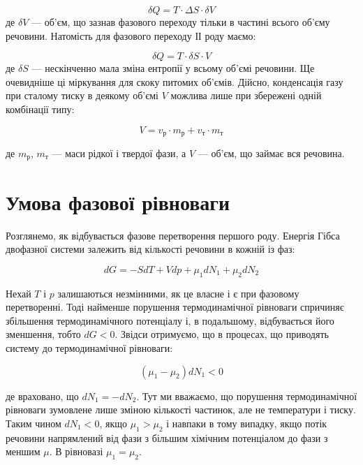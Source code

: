 \begin{equation}
\delta Q = T \cdot \Delta S \cdot \delta V
\end{equation}
%
де $\delta V$ --- об'єм, що зазнав фазового переходу тільки в частині всього об'єму речовини.
Натомість для фазового переходу ІІ роду маємо:

\begin{equation}
\delta Q = T \cdot \delta S \cdot V
\end{equation}
%
де $\delta S$ --- нескінченно мала зміна ентропії у всьому об'ємі речовини. Ще очевидніше ці
міркування для скоку питомих об'ємів. Дійсно, конденсація газу при сталому тиску в деякому об'ємі $V$
можлива лише при збережені одній комбінації типу:

\begin{equation}
V = v_{\text{р}} \cdot m_{\text{р}} + v_{\text{т}} \cdot m_{\text{т}}
\end{equation}

де $m_{\text{р}}$, $m_{\text{т}}$ --- маси рідкої і твердої фази, а $V$ --- об'єм, що займає вся
речовина.


\section{Умова фазової рівноваги}

Розглянемо, як відбувається фазове перетворення першого роду. Енергія Гібса двофазної
системи залежить від кількості речовини в кожній із фаз:

\begin{equation}
dG = -SdT + Vdp + \mu_1 dN_1 + \mu_2 dN_2
\end{equation}

Нехай $T$ і $p$ залишаються незмінними, як це власне і є при фазовому перетворенні. Тоді найменше
порушення термодинамічної рівноваги спричиняє збільшення термодинамічного потенціалу і, в подальшому,
відбувається його зменшення, тобто $dG < 0$. Звідси отримуємо, що в процесах, що приводять систему до
термодинамічної рівноваги:

\begin{equation}
(\mu_1 - \mu_2)dN_1 < 0
\end{equation}

де враховано, що $dN_1 = -dN_2$. Тут ми вважаємо, що порушення термодинамічної рівноваги зумовлене
лише зміною кількості частинок, але не температури і тиску. Таким чином $dN_1 < 0$, якщо $\mu_1 >
\mu_2$ і навпаки в тому випадку, якщо потік речовини напрямлений від фази з більшим хімічним
потенціалом до фази з меншим $\mu$. В рівновазі $\mu_1 = \mu_2$.

